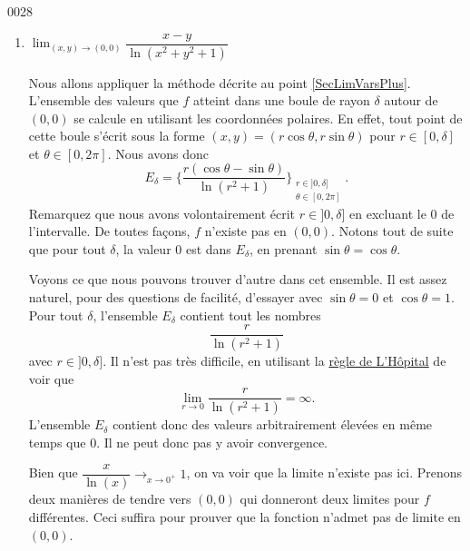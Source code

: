 \begin{corrige}{0028}
\begin{enumerate}
\begin{alternative}
			      La fonction est donc bornée par $5\epsilon$ dans la boule de rayon $\epsilon$, et converge donc vers zéro.
		      \end{alternative}



		\item   $\lim_{(x,y)\rightarrow (0,0)} \dfrac{x-y}{\ln(x^2+y^2+1)}$

		      Nous allons appliquer la méthode décrite au point \ref{SecLimVarsPlus}. L'ensemble des valeurs que $f$ atteint dans une boule de rayon $\delta$ autour de $(0,0)$ se calcule en utilisant les coordonnées polaires. En effet, tout point de cette boule s'écrit sous la forme $(x,y)=(r\cos\theta,r\sin\theta)$ pour $r\in[0,\delta]$ et $\theta\in[0,2\pi]$. Nous avons donc
		      \begin{equation}
			      E_{\delta}=\big\{  \frac{ r(\cos\theta-\sin\theta) }{ \ln(r^2+1) } \big\}_{\substack{r\in]0,\delta]\\\theta\in[0,2\pi]}}.
		      \end{equation}
		      Remarquez que nous avons volontairement écrit $r\in]0,\delta]$ en excluant le $0$ de l'intervalle. De toutes façons, $f$ n'existe pas en $(0,0)$. Notons tout de suite que pour tout $\delta$, la valeur $0$ est dans $E_{\delta}$, en prenant $\sin\theta=\cos\theta$.

		      Voyons ce que nous pouvons trouver d'autre dans cet ensemble. Il est assez naturel, pour des questions de facilité, d'essayer avec $\sin\theta=0$ et $\cos\theta=1$. Pour tout $\delta$, l'ensemble $E_{\delta}$ contient tout les nombres
		      \begin{equation}
			      \frac{ r }{ \ln(r^2+1) }
		      \end{equation}
		      avec $r\in]0,\delta]$. Il n'est pas très difficile, en utilisant la \href{http://fr.wikipedia.org/wiki/Règle_de_L'Hôpital}{règle de L'Hôpital} de voir que
		      \begin{equation}
			      \lim_{r\to 0}\frac{ r }{ \ln(r^2+1) }=\infty.
		      \end{equation}
		      L'ensemble $E_{\delta}$ contient donc des valeurs arbitrairement élevées en même temps que $0$. Il ne peut donc pas y avoir convergence.


		      \begin{alternative}

			      Bien que 	$\dfrac{x}{\ln(x)} \longrightarrow_{x\rightarrow 0^+}1$, on va voir que la limite n'existe pas ici. Prenons deux	 	manières de tendre vers $(0,0)$ qui donneront deux limites pour $f$ différentes. Ceci suffira pour prouver que la fonction n'admet pas de limite en $(0,0)$.


\end{alternative}
\end{enumerate}
\end{corrige}

